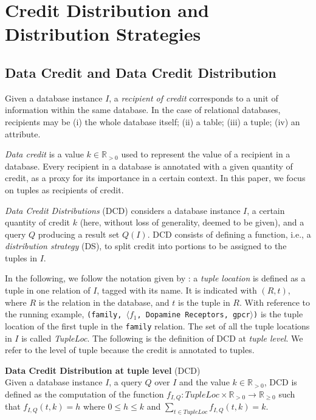 \section{Credit Distribution and Distribution Strategies}
\label{section:distribution_strategies}

\subsection{Data Credit and Data Credit Distribution}
Given a database instance $I$, a \emph{recipient of credit} corresponds to a unit of information within the same database. In the case of relational databases, recipients may be (i) the whole database itself; (ii) a table; (iii) a tuple; (iv) an attribute.

\emph{Data credit} is a value $k \in \mathbb{R}_{>0}$ used to represent the value of a recipient in a database. 
Every recipient in a database is annotated with a given quantity of credit, as a proxy for its importance in a certain context. In this paper, we focus on tuples as recipients of credit. 

\emph{Data Credit Distributions} (DCD) considers a database instance $I$, a certain quantity of credit $k$ (here, without loss of generality, deemed to be given), and a query $Q$ producing a result set $Q(I)$.  
DCD consists of defining a function, i.e., a \emph{distribution strategy} (DS), to split credit into portions to be assigned to the tuples in $I$.

In the following, we follow the notation given by \citet{CheneyProvSurvey}: a \emph{tuple location} is defined as a tuple in one relation of $I$, tagged with its name. It is indicated with $(R, t)$, where $R$ is the relation in the database, and $t$ is the tuple in $R$. With reference to the running example, \texttt{(family, $\langle f_1$, Dopamine Receptors, gpcr$\rangle$)} is the tuple location of the first tuple in the \texttt{family} relation.  The set of all the tuple locations in $I$ is called \emph{TupleLoc}.
The following is the definition of DCD at \emph{tuple level}. We refer to the level of tuple because the credit is annotated to tuples.

\begin{definition}
    \textbf{Data Credit Distribution at tuple level} (DCD)~\citep{dosso2020data}
    \label{def:CDT}\\
    Given a database instance $I$, a query $Q$ over $I$ and the value $k \in \mathbb{R}_{>0}$, DCD is defined as the computation of the function $f_{I, Q} : TupleLoc \times \mathbb{R}_{> 0} \rightarrow \mathbb{R}_{\geq0}$ such that $f_{I,Q}(t, k)=h$ where $0 \leq h \leq k$ and $\sum_{t \in TupleLoc}f_{I, Q}(t, k) = k$.
\end{definition}

